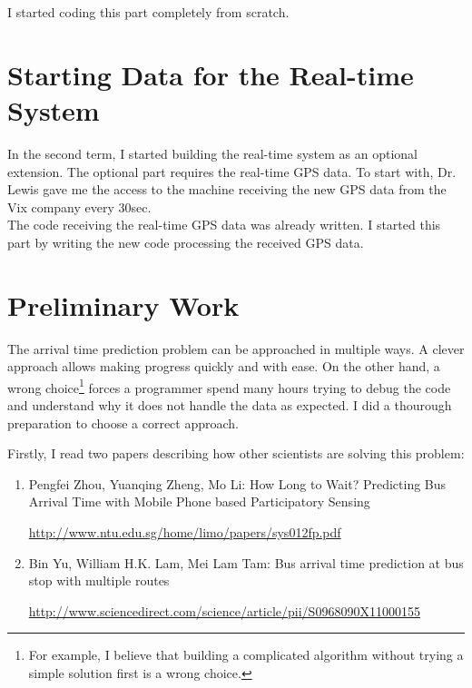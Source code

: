 \documentclass[12pt,a4paper,oneside,openright]{report}
\begin{document}
I started coding this part completely from scratch.

\section*{Starting Data for the Real-time System}
In the second term, I started building the real-time system as an optional extension.
The optional part requires the real-time GPS data. To start with, Dr. Lewis gave me
the access to the machine receiving the new GPS data from the Vix company every 30sec. \\

The code receiving the real-time GPS data was already written. I started this
part by writing the new code processing the received GPS data.

\section{Preliminary Work}

The arrival time prediction problem can be approached in multiple ways. A clever approach
allows making progress quickly and with ease. On the other hand, a wrong
choice\footnote{For example, I believe that building a complicated algorithm without
trying a simple solution first is a wrong choice.} forces a programmer spend many hours
trying to debug the code and understand why it does not handle the data as expected. I
did a thourough preparation to choose a correct approach. \\

\newpage

Firstly, I read two papers describing how other scientists are solving this problem:

\begin{enumerate}

\item Pengfei Zhou, Yuanqing Zheng, Mo Li: How Long to Wait? Predicting Bus Arrival Time with Mobile Phone based Participatory Sensing

\textcolor{blue}{\url{http://www.ntu.edu.sg/home/limo/papers/sys012fp.pdf}}

\item Bin Yu, William H.K. Lam, Mei Lam Tam: Bus arrival time prediction at
bus stop with multiple routes 

\textcolor{blue}{\url{http://www.sciencedirect.com/science/article/pii/S0968090X11000155}}

\end{enumerate}
\end{document}
